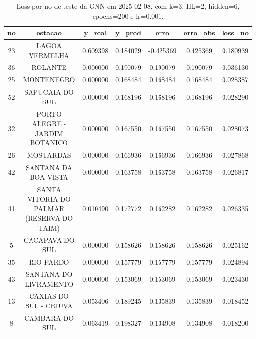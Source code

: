 \begin{table}[h]
\centering
\caption{Loss por no de teste da GNN em 2025-02-08, com k=3, HL=2, hidden=6, epochs=200 e lr=0.001.}
\label{tab:gnn_loss_k3_hl2_h6_e200_d20250208}
\begin{tabular}{ccccccc}
\toprule
no & estacao & y\_real & y\_pred & erro & erro\_abs & loss\_no \\
\midrule
23 & LAGOA VERMELHA & 0.609398 & 0.184029 & -0.425369 & 0.425369 & 0.180939 \\
36 & ROLANTE & 0.000000 & 0.190079 & 0.190079 & 0.190079 & 0.036130 \\
25 & MONTENEGRO & 0.000000 & 0.168484 & 0.168484 & 0.168484 & 0.028387 \\
52 & SAPUCAIA DO SUL & 0.000000 & 0.168196 & 0.168196 & 0.168196 & 0.028290 \\
32 & PORTO ALEGRE - JARDIM BOTANICO & 0.000000 & 0.167550 & 0.167550 & 0.167550 & 0.028073 \\
26 & MOSTARDAS & 0.000000 & 0.166936 & 0.166936 & 0.166936 & 0.027868 \\
42 & SANTANA DA BOA VISTA & 0.000000 & 0.163758 & 0.163758 & 0.163758 & 0.026817 \\
41 & SANTA VITORIA DO PALMAR (RESERVA DO TAIM) & 0.010490 & 0.172772 & 0.162282 & 0.162282 & 0.026335 \\
5 & CACAPAVA DO SUL & 0.000000 & 0.158626 & 0.158626 & 0.158626 & 0.025162 \\
35 & RIO PARDO & 0.000000 & 0.157779 & 0.157779 & 0.157779 & 0.024894 \\
43 & SANTANA DO LIVRAMENTO & 0.000000 & 0.153069 & 0.153069 & 0.153069 & 0.023430 \\
13 & CAXIAS DO SUL - CRIUVA & 0.053406 & 0.189245 & 0.135839 & 0.135839 & 0.018452 \\
8 & CAMBARA DO SUL & 0.063419 & 0.198327 & 0.134908 & 0.134908 & 0.018200 \\
\bottomrule
\end{tabular}
\end{table}
